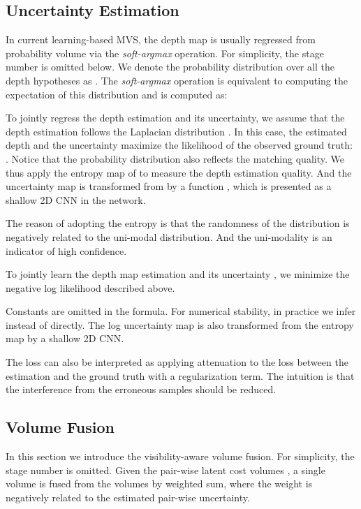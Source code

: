 \documentclass{bmvc2k}
\begin{document}
\subsection{Uncertainty Estimation}\label{method_uncertainty}
In current learning-based MVS, the depth map is usually regressed from probability volume via the \textit{soft-argmax} operation. For simplicity, the stage number  is omitted below. We denote the probability distribution over all the depth hypotheses as . The \textit{soft-argmax} operation is equivalent to computing the expectation of this distribution and  is computed as:



To jointly regress the depth estimation and its uncertainty, we assume that the depth estimation follows the Laplacian distribution \cite{kendall2017uncertainties}. In this case, the estimated depth and the uncertainty maximize the likelihood of the observed ground truth: . Notice that the probability distribution  also reflects the matching quality. We thus apply the entropy map  of  to measure the depth estimation quality. And the uncertainty map  is transformed from  by a function , which is presented as a shallow 2D CNN in the network. 

The reason of adopting the entropy is that the randomness of the distribution is negatively related to the uni-modal distribution. And the uni-modality is an indicator of high confidence.

To jointly learn the depth map estimation  and its uncertainty , we minimize the negative log likelihood described above. 

Constants are omitted in the formula. For numerical stability, in practice we infer  instead of  directly. The log uncertainty map  is also transformed from the entropy map  by a shallow 2D CNN. 

The loss can also be interpreted as applying attenuation to the  loss between the estimation and the ground truth with a regularization term. The intuition is that the interference from the erroneous samples should be reduced. 

\subsection{Volume Fusion}\label{method_fusion}
In this section we introduce the visibility-aware volume fusion. For simplicity, the stage number  is omitted. Given the pair-wise latent cost volumes , a single volume  is fused from the volumes by weighted sum, where the weight is negatively related to the estimated pair-wise uncertainty. 
\end{document}
